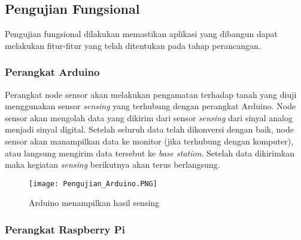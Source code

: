     \subsection{Pengujian Fungsional}
    Pengujian fungsional dilakukan memastikan aplikasi yang dibangun dapat melakukan fitur-fitur yang telah ditentukan pada tahap perancangan.
    
    \subsubsection{Perangkat Arduino}
    
    Perangkat node sensor akan melakukan pengamatan terhadap tanah yang diuji menggunakan sensor \textit{sensing} yang terhubung dengan perangkat Arduino. Node sensor akan mengolah data yang dikirim dari sensor \textit{sensing} dari sinyal analog menjadi sinyal digital. Setelah seluruh data telah dikonversi dengan baik, node sensor akan manampilkan data ke monitor (jika terhubung dengan komputer), atau langsung mengirim data tersebut ke \textit{base station}. Setelah data dikirimkan maka kegiatan \textit{sensing} berikutnya akan terus berlangsung. 
    
        \begin{figure}[H]
        	\centering  
        	\texttt{[image: Pengujian\_Arduino.PNG]}  
        	\caption[Arduino menampilkan hasil sensing]{Arduino menampilkan hasil sensing}
        	\label{fig:Arduino menampilkan hasil sensing} 
        \end{figure}
    
    \subsubsection{Perangkat Raspberry Pi}
    
